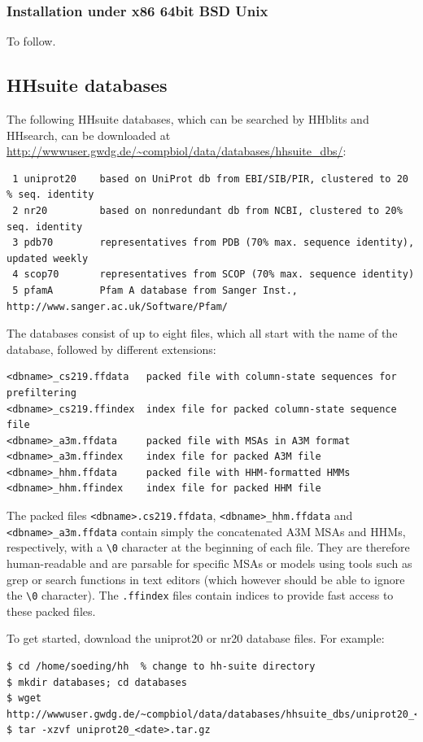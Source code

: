 \documentclass[11pt,a4paper]{article}
\begin{document}
\subsubsection*{Installation under x86 64bit BSD Unix}

To follow.


\subsection{HHsuite databases} \label{hhblits_dbs}
The following HHsuite databases, which can be searched by HHblits and HHsearch, 
can be downloaded at \url{http://wwwuser.gwdg.de/~compbiol/data/databases/hhsuite_dbs/}: 
\small 
\begin{verbatim}
 1 uniprot20    based on UniProt db from EBI/SIB/PIR, clustered to 20 % seq. identity
 2 nr20         based on nonredundant db from NCBI, clustered to 20% seq. identity
 3 pdb70        representatives from PDB (70% max. sequence identity), updated weekly
 4 scop70       representatives from SCOP (70% max. sequence identity)
 5 pfamA        Pfam A database from Sanger Inst., http://www.sanger.ac.uk/Software/Pfam/
\end{verbatim} 
\normalsize

The databases consist of up to eight files, which all start with the name of the database, followed by different extensions:
\begin{verbatim}
<dbname>_cs219.ffdata   packed file with column-state sequences for prefiltering
<dbname>_cs219.ffindex  index file for packed column-state sequence file
<dbname>_a3m.ffdata     packed file with MSAs in A3M format
<dbname>_a3m.ffindex    index file for packed A3M file
<dbname>_hhm.ffdata     packed file with HHM-formatted HMMs
<dbname>_hhm.ffindex    index file for packed HHM file
\end{verbatim}

The packed files \verb`<dbname>.cs219.ffdata`, \verb`<dbname>_hhm.ffdata` and \verb`<dbname>_a3m.ffdata` contain simply the concatenated A3M MSAs and HHMs, respectively, with a \verb`\0` character at the beginning of each file. They are therefore human-readable and are parsable for specific MSAs or models using tools such as grep or search functions in text editors (which however should be able to ignore the \verb`\0` character). The \verb`.ffindex` files contain indices to provide fast access to these packed files.

To get started, download the uniprot20 or nr20 database files. For example:
\begin{verbatim}
$ cd /home/soeding/hh  % change to hh-suite directory
$ mkdir databases; cd databases
$ wget http://wwwuser.gwdg.de/~compbiol/data/databases/hhsuite_dbs/uniprot20_<date>.tar.gz
$ tar -xzvf uniprot20_<date>.tar.gz
\end{verbatim}
\end{document}
